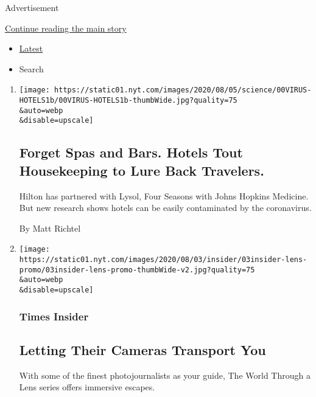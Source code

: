 Advertisement

\protect\hyperlink{after-mid2}{Continue reading the main story}

\begin{itemize}
\tightlist
\item
  \protect\hyperlink{stream-panel}{Latest}
\item
  Search
\end{itemize}

\begin{enumerate}
\def\labelenumi{\arabic{enumi}.}
\item
  \href{/2020/08/04/health/coronavirus-hotels-infect.html}{}

  \texttt{[image: https://static01.nyt.com/images/2020/08/05/science/00VIRUS-HOTELS1b/00VIRUS-HOTELS1b-thumbWide.jpg?quality=75\\\&auto=webp\\\&disable=upscale]}

  \hypertarget{forget-spas-and-bars-hotels-tout-housekeeping-to-lure-back-travelers}{%
  \subsection{Forget Spas and Bars. Hotels Tout Housekeeping to Lure
  Back
  Travelers.}\label{forget-spas-and-bars-hotels-tout-housekeeping-to-lure-back-travelers}}

  Hilton has partnered with Lysol, Four Seasons with Johns Hopkins
  Medicine. But new research shows hotels can be easily contaminated by
  the coronavirus.

  By Matt Richtel
\item
  \href{/2020/08/03/insider/letting-their-cameras-transport-you.html}{}

  \texttt{[image: https://static01.nyt.com/images/2020/08/03/insider/03insider-lens-promo/03insider-lens-promo-thumbWide-v2.jpg?quality=75\\\&auto=webp\\\&disable=upscale]}

  \hypertarget{times-insider}{%
  \subsubsection{Times Insider}\label{times-insider}}

  \hypertarget{letting-their-cameras-transport-you}{%
  \subsection{Letting Their Cameras Transport
  You}\label{letting-their-cameras-transport-you}}

  With some of the finest photojournalists as your guide, The World
  Through a Lens series offers immersive escapes.


\end{enumerate}
